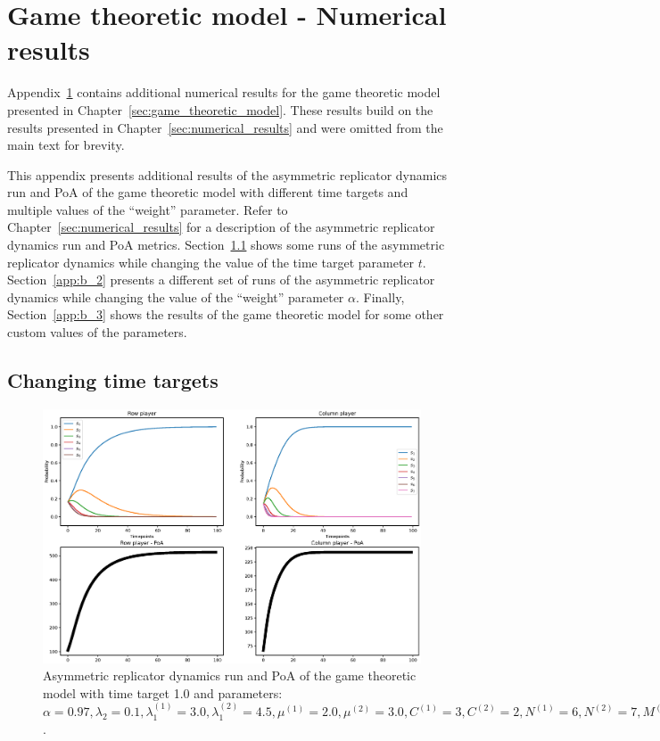 \chapter{Game theoretic model - Numerical results}
\label{appendix:game_theoretic_model}

Appendix~\ref{appendix:game_theoretic_model} contains additional numerical
results for the game theoretic model presented in
Chapter~\ref{sec:game_theoretic_model}.
These results build on the results presented in
Chapter~\ref{sec:numerical_results} and were omitted from the main text for
brevity.

This appendix presents additional results of the asymmetric replicator dynamics
run and PoA of the game theoretic model with different time targets and
multiple values of the ``weight'' parameter.
Refer to Chapter~\ref{sec:numerical_results} for a description of the
asymmetric replicator dynamics run and PoA metrics.
Section~\ref{app:b_1} shows some runs of the asymmetric replicator dynamics
while changing the value of the time target parameter \(t\).
Section~\ref{app:b_2} presents a different set of runs of the asymmetric
replicator dynamics while changing the value of the ``weight'' parameter
\(\alpha\).
Finally, Section~\ref{app:b_3} shows the results of the game theoretic model
for some other custom values of the parameters. 


\section{Changing time targets}\label{app:b_1}

\begin{figure}[H]
    \includegraphics[width=\textwidth, trim = 0 60 0 60, clip]{chapters/00_appendix/02_more_game_results/Bin/poa_ard_target_1.eps}
    \caption{Asymmetric replicator dynamics run and PoA of the game theoretic
    model with time target 1.0 and parameters: \(\alpha = 0.97,
    \lambda_2 = 0.1, \lambda_1^{(1)} = 3.0, \lambda_1^{(2)} = 4.5,
    \mu^{(1)} = 2.0, \mu^{(2)} = 3.0, C^{(1)} = 3, C^{(2)} = 2,
    N^{(1)} = 6, N^{(2)} = 7, M^{(1)} = 5, M^{(2)} = 4\).}
    \label{fig:poa_ard_target_1}
\end{figure}


